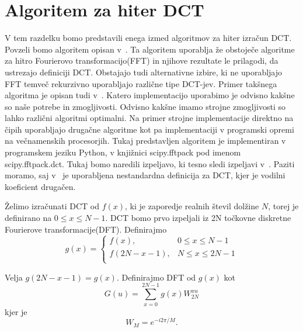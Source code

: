 \documentclass[a4paper,12pt,openright]{book}
\begin{document}
\section{Algoritem za hiter DCT}\label{Algoritem za hiter DCT}
V tem razdelku bomo predstavili enega izmed algoritmov za hiter izračun DCT. Povzeli bomo algoritem opisan v~\cite{FastDCT}.
Ta algoritem uporablja že obstoječe algoritme za hitro Fourierovo transformacijo(FFT) in njihove rezultate le prilagodi, da ustrezajo definiciji DCT. Obstajajo tudi alternativne izbire, ki ne uporabljajo FFT temveč rekurzivno uporabljajo različne tipe DCT-jev. Primer takšnega algoritma je opisan tudi v~\cite{britanak2010discrete}. Katero implementacijo uporabimo je odvisno kakšne so naše potrebe in zmogljivosti. Odvisno kakšne imamo strojne zmogljivosti so lahko različni algoritmi optimalni. Na primer strojne implementacije direktno na čipih uporabljajo drugačne algoritme kot pa implementaciji v programski opremi na večnamenskih procesorjih. Tukaj predstavljen algoritem je implementiran v programskem jeziku Python, v knjižnici scipy.fftpack pod imenom scipy.fftpack.dct. Tukaj bomo naredili izpeljavo, ki tesno sledi izpeljavi v~\cite{FastDCT}. Paziti moramo, saj v~\cite{FastDCT} je uporabljena nestandardna definicija za DCT, kjer je vodilni koeficient drugačen.\par
Želimo izračunati DCT od $f(x)$, ki je zaporedje realnih števil dolžine $N$, torej je definirano na $0 \leq x \leq N-1$. DCT bomo prvo izpeljali iz 2N točkovne diskretne Fourierove transformacije(DFT). Definirajmo 
\begin{equation}
  g(x)=
    \begin{cases}
          f(x), & 0 \leq x \leq N-1 \\
          f(2N-x-1), & N \leq x \leq 2N-1 \\
    \end{cases}
\label{eq:fastDCT_y}
\end{equation}

Velja $g(2N-x-1) = g(x)$.
Definirajmo DFT od $g(x)$ kot
\begin{equation}
  G(u) = \sum_{x=0}^{2N-1} g(x) W_{2N}^{xu}
\label{eq:DFT}
\end{equation}
kjer je
\begin{equation}
  W_{M} = e^{-i2\pi/M}.
\label{eq:DFT_W}
\end{equation}
\end{document}
